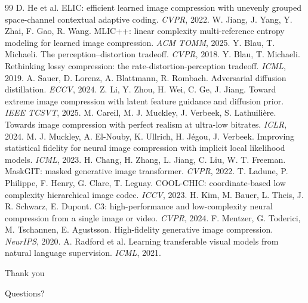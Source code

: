 \documentclass[aspectratio=169]{beamer}
\begin{document}
\begin{frame}[t]
  \tiny
  \begin{thebibliography}{99}
     D. He et al. ELIC: efficient learned image compression with unevenly grouped space-channel contextual adaptive coding. \emph{CVPR}, 2022.
     W. Jiang, J. Yang, Y. Zhai, F. Gao, R. Wang. MLIC++: linear complexity multi-reference entropy modeling for learned image compression. \emph{ACM TOMM}, 2025.
     Y. Blau, T. Michaeli. The perception--distortion tradeoff. \emph{CVPR}, 2018.
     Y. Blau, T. Michaeli. Rethinking lossy compression: the rate-distortion-perception tradeoff. \emph{ICML}, 2019.
     A. Sauer, D. Lorenz, A. Blattmann, R. Rombach. Adversarial diffusion distillation. \emph{ECCV}, 2024.
     Z. Li, Y. Zhou, H. Wei, C. Ge, J. Jiang. Toward extreme image compression with latent feature guidance and diffusion prior. \emph{IEEE TCSVT}, 2025.
     M. Careil, M. J. Muckley, J. Verbeek, S. Lathuili\`ere. Towards image compression with perfect realism at ultra-low bitrates. \emph{ICLR}, 2024.
     M. J. Muckley, A. El-Nouby, K. Ullrich, H. J\'egou, J. Verbeek. Improving statistical fidelity for neural image compression with implicit local likelihood models. \emph{ICML}, 2023.
     H. Chang, H. Zhang, L. Jiang, C. Liu, W. T. Freeman. MaskGIT: masked generative image transformer. \emph{CVPR}, 2022.
     T. Ladune, P. Philippe, F. Henry, G. Clare, T. Leguay. COOL-CHIC: coordinate-based low complexity hierarchical image codec. \emph{ICCV}, 2023.
     H. Kim, M. Bauer, L. Theis, J. R. Schwarz, E. Dupont. C3: high-performance and low-complexity neural compression from a single image or video. \emph{CVPR}, 2024.
     F. Mentzer, G. Toderici, M. Tschannen, E. Agustsson. High-fidelity generative image compression. \emph{NeurIPS}, 2020.
     A. Radford et al. Learning transferable visual models from natural language supervision. \emph{ICML}, 2021.
  \end{thebibliography}
\end{frame}

\begin{frame}[plain]
  \begin{center}
    {\Huge Thank you}

    \bigskip
    {\Large Questions?}
  \end{center}
\end{frame}
\end{document}
